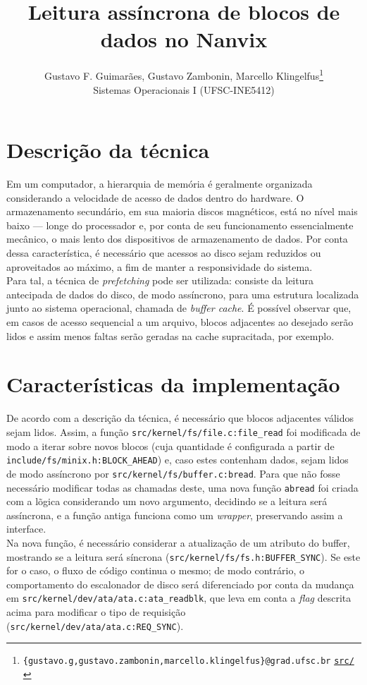 \documentclass[12pt]{article}
\title{\textbf{Leitura assíncrona de blocos de dados no Nanvix}}
\author{
  Gustavo F. Guimarães, Gustavo Zambonin, Marcello Klingelfus\thanks{
    \texttt{\{gustavo.g,gustavo.zambonin,marcello.klingelfus\}@grad.ufsc.br}
    \hfill \texttt{\href{https://github.com/zambonin/nanvix}{src/}}
  } \\
  \small{Sistemas Operacionais I (UFSC-INE5412)}
}
\date{}
\begin{document}
\maketitle

\section{Descrição da técnica}

Em um computador, a hierarquia de memória é geralmente organizada considerando
a velocidade de acesso de dados dentro do hardware. O armazenamento secundário,
em sua maioria discos magnéticos, está no nível mais baixo --- longe do
processador e, por conta de seu funcionamento essencialmente mecânico, o mais
lento dos dispositivos de armazenamento de dados. Por conta dessa
característica, é necessário que acessos ao disco sejam reduzidos ou
aproveitados ao máximo, a fim de manter a responsividade do sistema. \\

Para tal, a técnica de \emph{prefetching} pode ser utilizada: consiste da
leitura antecipada de dados do disco, de modo assíncrono, para uma estrutura
localizada junto ao sistema operacional, chamada de \emph{buffer cache}. É
possível observar que, em casos de acesso sequencial a um arquivo, blocos
adjacentes ao desejado serão lidos e assim menos faltas serão geradas na cache
supracitada, por exemplo.

\section{Características da implementação}

De acordo com a descrição da técnica, é necessário que blocos adjacentes
válidos sejam lidos. Assim, a função \texttt{src/kernel/fs/file.c:file\_read}
foi modificada de modo a iterar sobre novos blocos (cuja quantidade é
configurada a partir de \texttt{include/fs/minix.h:BLOCK\_AHEAD}) e, caso estes
contenham dados, sejam lidos de modo assíncrono por
\texttt{src/kernel/fs/buffer.c:bread}. Para que não fosse necessário modificar
todas as chamadas deste, uma nova função \texttt{abread} foi criada com a
lõgica considerando um novo argumento, decidindo se a leitura será assíncrona,
e a função antiga funciona como um \emph{wrapper}, preservando assim a
interface. \\

Na nova função, é necessário considerar a atualização de um atributo
do buffer, mostrando se a leitura será síncrona
(\texttt{src/kernel/fs/fs.h:BUFFER\_SYNC}). Se este for o caso, o fluxo de
código continua o mesmo; de modo contrário, o comportamento do escalonador de
disco será diferenciado por conta da mudança em
\texttt{src/kernel/dev/ata/ata.c:ata\_readblk}, que leva em conta a \emph{flag}
descrita acima para modificar o tipo de requisição
(\texttt{src/kernel/dev/ata/ata.c:REQ\_SYNC}).
\end{document}
